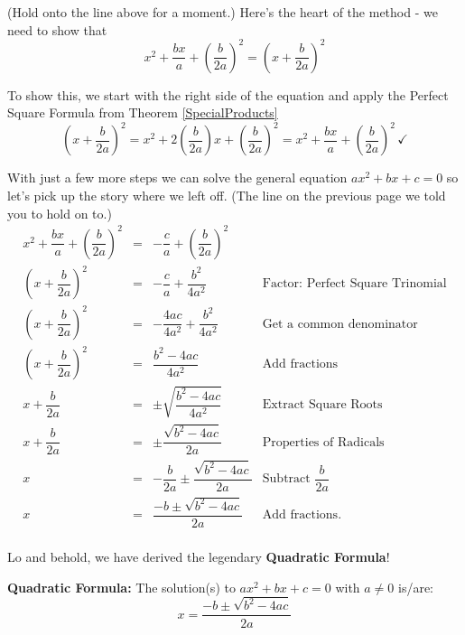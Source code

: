 \documentclass{ximera}
\begin{document}
(Hold onto the line above for a moment.)  Here's the heart of the method - we need to show that \[ x^2 + \dfrac{bx}{a} + \left(\dfrac{b}{2a}\right)^2 = \left(x + \dfrac{b}{2a}\right)^2 \]

To show this, we start with the right side of the equation and apply the Perfect Square Formula from Theorem \ref{SpecialProducts} \[ \left(x + \dfrac{b}{2a}\right)^2 = x^2 + 2\left(\dfrac{b}{2a}\right)x + \left(\dfrac{b}{2a}\right)^2 = x^2 + \dfrac{bx}{a} + \left(\dfrac{b}{2a}\right)^2 \, \checkmark \]

With just a few more steps we can solve the general equation $ax^{2} + bx + c = 0$ so let's pick up the story where we left off. (The line on the previous page we told you to hold on to.)\[ \begin{array}{rclr}

x^2 + \dfrac{bx}{a} + \left(\dfrac{b}{2a}\right)^2 & = & -\dfrac{c}{a} + \left(\dfrac{b}{2a}\right)^2 & \\ [8pt]
\left(x + \dfrac{b}{2a}\right)^2 & = & -\dfrac{c}{a} + \dfrac{b^2}{4a^2} & \text{Factor: Perfect Square Trinomial} \\ [3pt]

\left(x + \dfrac{b}{2a}\right)^2 & = & -\dfrac{4ac}{4a^2} + \dfrac{b^2}{4a^2} & \text{Get a common denominator}\\

\left(x + \dfrac{b}{2a}\right)^2 & = & \dfrac{b^2 - 4ac}{4a^2} & \text{Add fractions}\\ [5pt]

x + \dfrac{b}{2a} & = & \pm \sqrt{\dfrac{b^2 - 4ac}{4a^2}} & \text{Extract Square Roots} \\ [8pt]

x + \dfrac{b}{2a} & = & \pm \dfrac{\sqrt{b^2 - 4ac}}{2a} & \text{Properties of Radicals} \\ [8pt]

x  & = & - \dfrac{b}{2a} \pm \dfrac{\sqrt{b^2 - 4ac}}{2a} & \text{Subtract $\dfrac{b}{2a}$} \\ [8pt]

x  & = & \dfrac{-b \pm \sqrt{b^2 - 4ac}}{2a} & \text{Add fractions.} \\

\end{array}\]

Lo and behold, we have derived the legendary \textbf{Quadratic Formula}!

\medskip

\colorbox{ResultColor}{\bbm

\begin{thm}\label{quadraticformula}  \textbf{Quadratic Formula:} The solution(s) to $ax^2 + bx + c = 0$ with $a \neq 0$ is/are: \[x  = \dfrac{-b \pm \sqrt{b^2 - 4ac}}{2a} \]

\end{thm}

\ebm}
\end{document}
